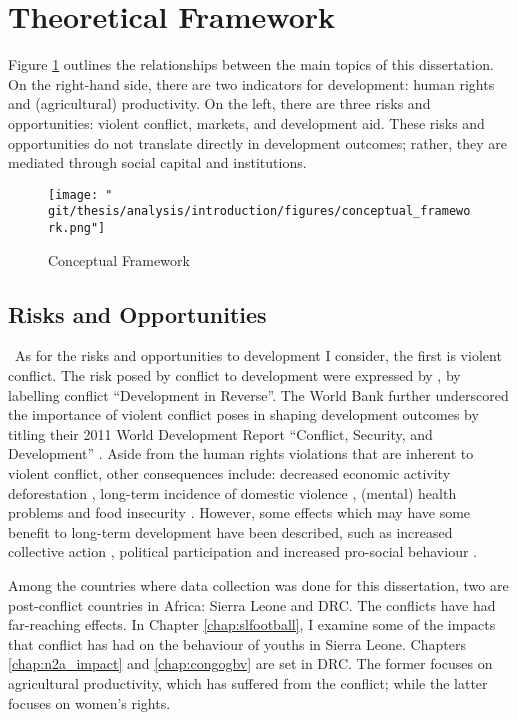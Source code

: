 \section{Theoretical Framework}
Figure \ref{intro:fig:framework} outlines the relationships between the main topics of this dissertation. On the right-hand side, there are two indicators for development: human rights and (agricultural) productivity. On the left, there are three risks and opportunities: violent conflict, markets, and development aid. These risks and opportunities do not translate directly in development outcomes; rather, they are mediated through social capital and institutions.

\begin{figure}[htb]
  \centering
  \texttt{[image: "\\git/thesis/analysis/introduction/figures/conceptual\_framework.png"]}
  \caption{Conceptual Framework}
  \label{intro:fig:framework}
\end{figure}

\subsection{Risks and Opportunities}\
As for the risks and opportunities to development I consider, the first is violent conflict. The risk posed by conflict to development were expressed by \citet{Collier2003}, by labelling conflict ``Development in Reverse''. The World Bank further underscored the importance of violent conflict poses in shaping development outcomes by titling their 2011 World Development Report ``Conflict, Security, and Development'' \citep{WorldBank2011}. Aside from the human rights violations that are inherent to violent conflict, other consequences include: decreased economic activity \citep{Collier1999} deforestation \cite[e.g.][]{Connectiona}, long-term incidence of domestic violence \citep[e.g.][]{LaMattina2017, Muller2019}, (mental) health problems \cite[e.g.][]{Smith2002, Iqbal2006a,Akresh2011} and food insecurity \cite[e.g.][]{Lecoutere2005, Verwimp2012}. However, some effects which may have some benefit to long-term development have been described, such as increased collective action \citep{Bellows2009b}, political participation \citep{Blattman2009a} and increased pro-social behaviour \citep{Voors2012a}.

Among the countries where data collection was done for this dissertation, two are post-conflict countries in Africa: Sierra Leone and DRC. The conflicts have had far-reaching effects. In Chapter \ref{chap:slfootball}, I examine some of the impacts that conflict has had on the behaviour of youths in Sierra Leone. Chapters \ref{chap:n2a_impact} and \ref{chap:congogbv} are set in DRC. The former focuses on agricultural productivity, which has suffered from the conflict; while the latter focuses on women's rights. %

